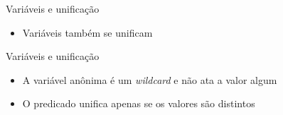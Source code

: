 \begin{frame}[fragile]{Variáveis e unificação}

    \begin{itemize}
        \item Variáveis também se unificam


    \end{itemize}

\end{frame}

\begin{frame}[fragile]{Variáveis e unificação}

    \begin{itemize}
        \item A variável anônima é um \textit{wildcard} e não ata a valor algum

        \item O predicado  unifica apenas se os valores são distintos

    \end{itemize}

\end{frame}
